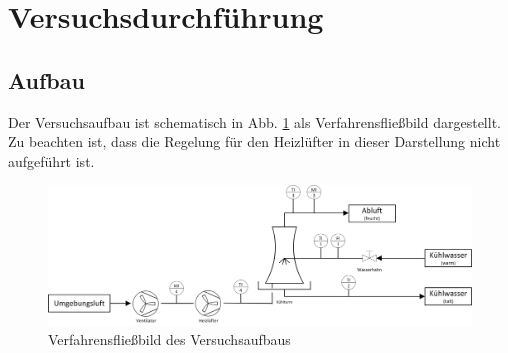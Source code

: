 \newpage
\section{Versuchsdurchführung}

\subsection*{Aufbau}
Der Versuchsaufbau ist schematisch in Abb. \ref{fig:fliessbild} als Verfahrensfließbild dargestellt. Zu beachten ist, dass die Regelung für den Heizlüfter  in dieser Darstellung nicht aufgeführt ist.

\begin{figure}[h!]
	\centering
	\includegraphics[width=\textwidth]{img/fliessbild}
	\caption{Verfahrensfließbild des Versuchsaufbaus}
	\label{fig:fliessbild}
\end{figure}
\FloatBarrier

